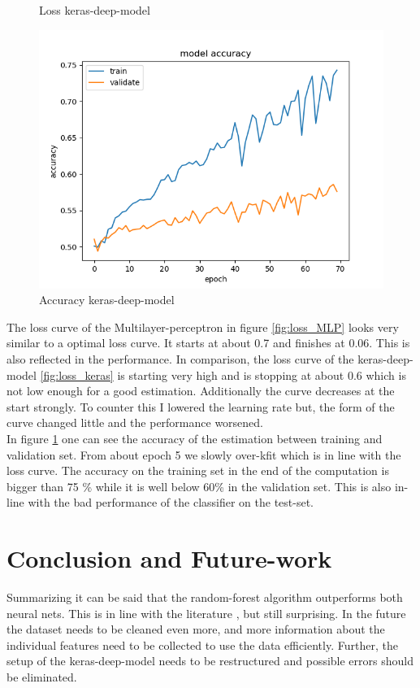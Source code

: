 \documentclass[12pt]{article}
\begin{document}
\begin{figure}[!htb]
  \caption{Loss keras-deep-model}\label{fig:loss_keras}
\endminipage\hfill
{}%
  \includegraphics[width=\linewidth]{./figures/keras-deep-model-accuracy-curve.png}
  \caption{Accuracy keras-deep-model}\label{fig:accuracy_keras}
\endminipage
\end{figure}

The loss curve of the Multilayer-perceptron in figure \ref{fig:loss_MLP} looks very similar to a optimal loss curve. It starts at about 0.7 and finishes at 0.06. This is also  reflected in the performance. In comparison, the loss curve of the keras-deep-model \ref{fig:loss_keras} is starting very high and is stopping at about 0.6 which is not low enough for a good estimation. Additionally the curve decreases at the start strongly. To counter this I lowered the learning rate but, the form of the curve changed little and the performance worsened.\\In figure \ref{fig:accuracy_keras} one can see the accuracy of the estimation between training and validation set. From about epoch 5 we slowly over-kfit which is in line with the loss curve. The accuracy on the training set in the end of the computation is bigger than 75 \% while it is well below 60\% in the validation set. This  is also in-line with the bad performance of the classifier on the test-set.
 
\section{Conclusion and Future-work}\label{sec:Conclusio}
Summarizing it can be said that the random-forest algorithm outperforms both neural nets. This is in line with the literature \cite{robinson2020}, but still surprising.
%
In the future the dataset needs to be cleaned even more, and more information about the individual features need to be collected to use the data efficiently.
%
Further, the setup of the keras-deep-model needs to be restructured and possible errors should be eliminated.



\end{document}
